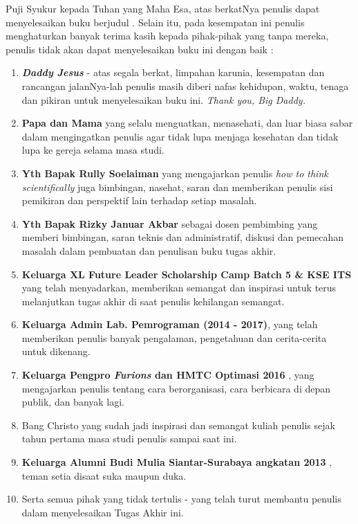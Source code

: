 	  Puji Syukur kepada Tuhan yang Maha Esa, atas berkatNya penulis dapat menyelesaikan buku berjudul \textbf{\judul}. 
	  \newline
	  \indent Selain itu, pada kesempatan ini penulis menghaturkan banyak terima kasih kepada pihak-pihak yang tanpa mereka, penulis tidak akan dapat menyelesaikan buku ini dengan baik :
  \begin{enumerate}
  	\item \textbf{\textit{Daddy Jesus}} - atas segala berkat, limpahan karunia, kesempatan dan rancangan jalanNya-lah penulis masih diberi nafas kehidupan, waktu, tenaga dan pikiran untuk menyelesaikan buku ini. \textit{Thank you, Big Daddy.}
    \item \textbf{Papa dan Mama} yang selalu menguatkan, menasehati, dan luar biasa sabar dalam mengingatkan penulis agar tidak lupa menjaga kesehatan dan tidak lupa ke gereja selama masa studi.
    \item \textbf{Yth Bapak Rully Soelaiman} yang mengajarkan penulis \textit{how to think scientifically} juga bimbingan, nasehat, saran dan memberikan penulis sisi pemikiran dan perspektif lain terhadap setiap masalah.
    \item \textbf{Yth Bapak Rizky Januar Akbar} sebagai dosen pembimbing yang memberi bimbingan, saran teknis dan administratif, diskusi dan pemecahan masalah dalam pembuatan dan penulisan buku tugas akhir.
    \item \textbf{Keluarga XL Future Leader Scholarship Camp Batch 5 \& KSE ITS} yang telah menyadarkan, memberikan semangat dan inspirasi untuk terus melanjutkan tugas akhir di saat penulis kehilangan semangat.
    \item \textbf{Keluarga Admin Lab. Pemrograman (2014 - 2017)}, yang telah memberikan penulis banyak pengalaman, pengetahuan dan cerita-cerita untuk dikenang.
    \item  \textbf{Keluarga Pengpro \textit{Furions} dan HMTC Optimasi 2016 }, yang mengajarkan penulis tentang cara berorganisasi, cara berbicara di depan publik, dan banyak lagi. 
    \item Bang Christo yang sudah jadi inspirasi dan semangat kuliah penulis sejak tahun pertama masa studi penulis sampai saat ini.  
    \item \textbf{Keluarga Alumni Budi Mulia Siantar-Surabaya angkatan 2013 }, teman setia disaat suka maupun duka. 
    \item Serta semua pihak yang tidak tertulis - yang telah turut membantu penulis dalam menyelesaikan Tugas Akhir ini.
  \end{enumerate}
  
